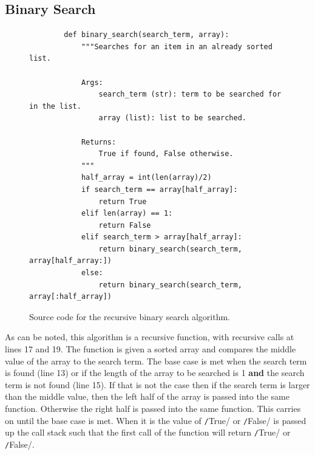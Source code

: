 \documentclass[twoside, 12pt]{report}
\begin{document}
\subsection{Binary Search}
\begin{figure}[H]
	\begin{verbatim}
		def binary_search(search_term, array):
			"""Searches for an item in an already sorted list.
	
			Args:
				search_term (str): term to be searched for in the list.
				array (list): list to be searched.
	
			Returns:
				True if found, False otherwise.
			"""
			half_array = int(len(array)/2)
			if search_term == array[half_array]:
				return True
			elif len(array) == 1:
				return False
			elif search_term > array[half_array]:
				return binary_search(search_term, array[half_array:])
			else:
				return binary_search(search_term, array[:half_array])
	\end{verbatim}
	\caption{Source code for the recursive binary search algorithm.}
\end{figure}

As can be noted, this algorithm is a recursive function, with recursive calls at lines 17 and 19. The function is given a sorted array and compares the middle value of the array to the search term. The base case is met when the search term is found (line 13) or if the length of the array to be searched is 1 \textbf{and} the search term is not found (line 15). If that is not the case then if the search term is larger than the middle value, then the left half of the array is passed into the same function. Otherwise the right half is passed into the same function. This carries on until the base case is met. When it is the value of \texttt/True/ or \texttt/False/ is passed up the call stack such that the first call of the function will return \texttt/True/ or \texttt/False/.
\end{document}
